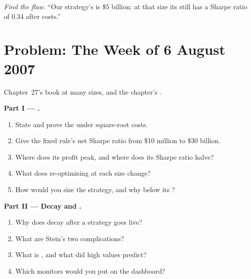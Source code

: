 \begin{exercise}[$\star\star\star$]\label{exo:rs:capacity-decay-and-crowding:8}
\emph{Find the flaw.} ``Our strategy's  is \$5 billion: at that size its  still has a Sharpe ratio of 0.34 after costs.''
\end{exercise}

\section{Problem: The Week of 6 August 2007}

\begin{problem}\label{pb:rs:capacity-decay-and-crowding:1}
Chapter~27's book at many sizes, and the chapter's .

\medskip\noindent\textbf{Part I --- .}
\begin{enumerate}
\item State and prove the  under square-root costs.
\item Give the fixed rule's net Sharpe ratio from \$10 million to \$30 billion.
\item Where does its profit peak, and where does its Sharpe ratio halve?
\item What does re-optimising at each size change?
\item How would you size the strategy, and why below its ?
\end{enumerate}

\medskip\noindent\textbf{Part II --- Decay and .}
\begin{enumerate}[resume]
\item Why does  decay after a strategy goes live?
\item What are Stein's two complications?
\item What is , and what did high values predict?
\item Which monitors would you put on the dashboard?
\end{enumerate}


\end{problem}
